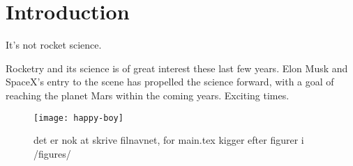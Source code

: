 \chapter{Introduction}

It's not rocket science.

Rocketry and its science is of great interest these last few years. Elon Musk and SpaceX's entry to the scene has propelled the science forward, with a goal of reaching the planet Mars within the coming years. Exciting times.

\begin{figure}
\texttt{[image: happy-boy]}
\caption{det er nok at skrive filnavnet, for main.tex kigger efter figurer i /figures/}
\label{fig:yyy}
\end{figure}
